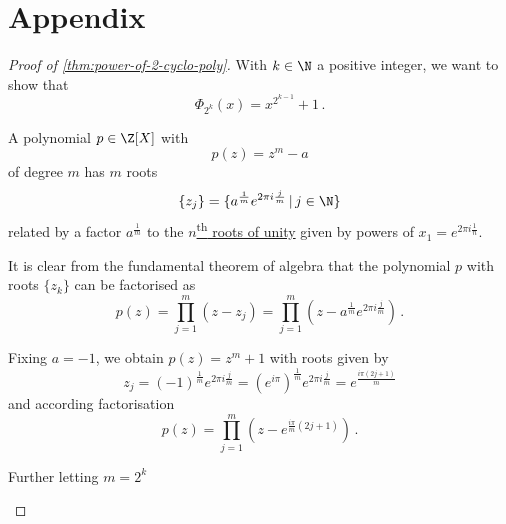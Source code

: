 \chapter*{Appendix}

\begin{proof}[Proof of \autoref{thm:power-of-2-cyclo-poly}]
  With $k \in \N$ a positive integer, we want to show that
  $$\Phi_{2^k} (x) = x^{2^{k-1}} + 1\,.$$

  A polynomial $p \in \Z[X]$ with $$p(z) = z^m - a$$ of degree $m$ has $m$ roots
  $$\{z_j\} = \{a^\frac{1}{m} e^{2\pi i \frac{j}{m}} \,|\, j \in \N\}$$
  related by a factor $a^\frac{1}{m}$ to the
  \hyperref[lemma:nth-roots-of-unity]{$n$\textsuperscript{th} roots of unity} given by powers of
  $x_1 = e^{2\pi i \frac{1}{n}}$.

  It is clear from the fundamental theorem of algebra that the polynomial $p$ with roots $\{z_k\}$
  can be factorised as
  $$p(z) = \prod_{j=1}^{m} (z - z_j) = \prod_{j=1}^{m} (z - a^\frac{1}{m} e^{2\pi i \frac{j}{m}})\,.$$

  Fixing $a = -1$, we obtain $p(z) = z^m + 1$ with roots given by
  $$z_j = (-1)^\frac{1}{m} e^{2\pi i \frac{j}{m}}
    = (e^{i\pi})^\frac{1}{m} e^{2\pi i \frac{j}{m}}
    = e^{\frac{i\pi (2j + 1)}{m}}$$
  and according factorisation
  $$p(z) = \prod_{j=1}^{m} (z - e^{\frac{i\pi}{m} (2j + 1)})\,.$$

  Further letting $m = 2^{k}$

  \parencite{power-of-2-cyclo-poly}
\end{proof}
